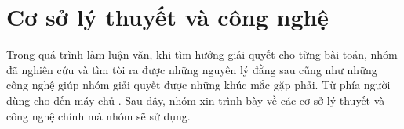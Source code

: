 \chapter{Cơ sở lý thuyết và công nghệ}\label{chap:Tech}
		Trong quá trình làm luận văn, khi tìm hướng giải quyết cho từng bài toán, nhóm đã
		nghiên cứu và tìm tòi ra được những nguyên lý đằng sau cũng như những công nghệ giúp
		nhóm giải quyết được những khúc mắc gặp phải. Từ phía người dùng cho đến máy chủ
		. Sau đây, nhóm xin trình bày về các cơ sở lý thuyết và công nghệ chính mà nhóm sẽ sử dụng.
		
	
	
	